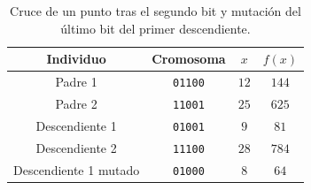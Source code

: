 \begin{table}[H]
\centering
\small
\setlength{\tabcolsep}{6pt}
\renewcommand{\arraystretch}{1.15}
\begin{tabular}{|c|c|c|c|}
\hline
\rowcolor{encabezado}\textbf{Individuo} & \textbf{Cromosoma} & \textbf{$x$} & \textbf{$f(x)$} \\
\hline
Padre 1 & \texttt{01100} & $12$ & $144$ \\
\hline
Padre 2 & \texttt{11001} & $25$ & $625$ \\
\hline
Descendiente 1 & \texttt{01001} & $9$ & $81$ \\
\hline
Descendiente 2 & \texttt{11100} & $28$ & $784$ \\
\hline
Descendiente 1 mutado & \texttt{01000} & $8$ & $64$ \\
\hline
\end{tabular}
\caption{Cruce de un punto tras el segundo bit y mutación del último bit del primer descendiente.}
\label{tab:p1a-cruce}
\end{table}

